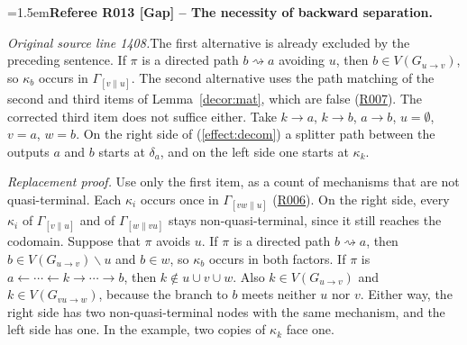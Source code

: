 \documentclass[12pt]{amsart}
\newcommand{\RefereeRemark}[4]{%
  \par\medskip\begingroup\normalfont\small\color{RefereePurple}%
  \emergencystretch=1.5em\noindent\textbf{Referee R#1 [#2] -- #3.}\par\nobreak\noindent #4\par
  \endgroup\medskip
}
\theoremstyle{plain}
\theoremstyle{definition}
\theoremstyle{remark}
\numberwithin{equation}{section}
\theoremstyle{plain}
\newcommand{\0}{\emptyset}
\newcommand{\mi}{\smallsetminus}
\newcommand{\stri}{\Gamma}
\begin{document}
\hypertarget{review-013}{}\RefereeRemark{013}{Gap}{The necessity of backward separation}{%
\textit{Original source line 1408.}\quad The first alternative is already excluded by the preceding sentence. If $\pi$ is a directed path $b \rightsquigarrow a$ avoiding $u$, then $b \in V(G_{u \rightarrow v})$, so $\kappa_b$ occurs in $\stri_{[v \| u]}$. The second alternative uses the path matching of the second and third items of Lemma~\ref{decor:mat}, which are false (\hyperlink{review-007}{R007}). The corrected third item does not suffice either. Take $k \rightarrow a$, $k \rightarrow b$, $a \rightarrow b$, $u = \0$, $v = a$, $w = b$. On the right side of (\ref{effect:decom}) a splitter path between the outputs $a$ and $b$ starts at $\delta_a$, and on the left side one starts at $\kappa_k$.
\par\smallskip\emph{Replacement proof.} Use only the first item, as a count of mechanisms that are not quasi-terminal. Each $\kappa_i$ occurs once in $\stri_{[vw \| u]}$ (\hyperlink{review-006}{R006}). On the right side, every $\kappa_i$ of $\stri_{[v \| u]}$ and of $\stri_{[w \| vu]}$ stays non-quasi-terminal, since it still reaches the codomain. Suppose that $\pi$ avoids $u$. If $\pi$ is a directed path $b \rightsquigarrow a$, then $b \in V(G_{u \rightarrow v}) \mi u$ and $b \in w$, so $\kappa_b$ occurs in both factors. If $\pi$ is $a \leftarrow \cdots \leftarrow k \rightarrow \cdots \rightarrow b$, then $k \notin u \cup v \cup w$. Also $k \in V(G_{u \rightarrow v})$ and $k \in V(G_{vu \rightarrow w})$, because the branch to $b$ meets neither $u$ nor $v$. Either way, the right side has two non-quasi-terminal nodes with the same mechanism, and the left side has one. In the example, two copies of $\kappa_k$ face one.
}
\end{document}
